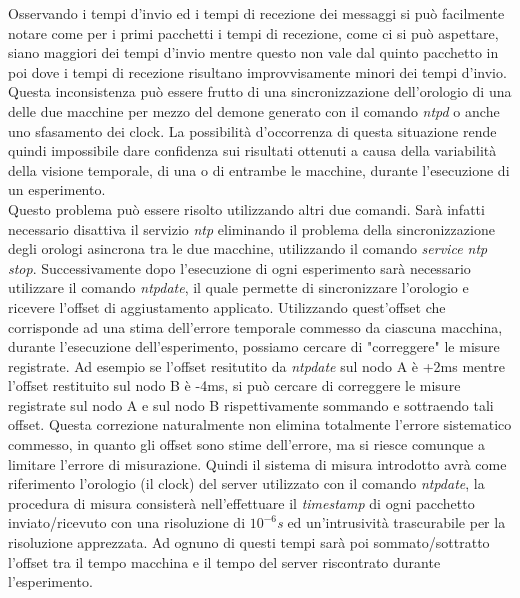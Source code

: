 Osservando i tempi d'invio ed i tempi di recezione dei messaggi si può facilmente notare come per i primi pacchetti i tempi di recezione, come ci si può aspettare, siano maggiori dei tempi d'invio mentre questo non vale dal quinto pacchetto in poi dove i tempi di recezione risultano improvvisamente minori dei tempi d'invio. Questa inconsistenza può essere frutto di una sincronizzazione dell'orologio di una delle due macchine per mezzo del demone generato con il comando \textit{ntpd} o anche uno sfasamento dei clock. La possibilità d'occorrenza di questa situazione rende quindi impossibile dare confidenza sui risultati ottenuti a causa della variabilità della visione temporale, di una o di entrambe le macchine, durante l'esecuzione di un esperimento.\\
Questo problema può essere risolto utilizzando altri due comandi. Sarà infatti necessario disattiva il servizio \textit{ntp} eliminando il problema della sincronizzazione degli orologi asincrona tra le due macchine, utilizzando il comando \textit{service ntp stop}. Successivamente dopo l'esecuzione di ogni esperimento sarà necessario utilizzare il comando \textit{ntpdate}, il quale permette di sincronizzare l'orologio e ricevere l'offset di aggiustamento applicato. Utilizzando quest'offset che corrisponde ad una stima dell'errore temporale commesso da ciascuna macchina, durante l'esecuzione dell'esperimento, possiamo cercare di "correggere" le misure registrate. Ad esempio se l'offset resitutito da \textit{ntpdate} sul nodo A è +2ms mentre l'offset restituito sul nodo B è -4ms, si può cercare di correggere le misure registrate sul nodo A e sul nodo B rispettivamente sommando e sottraendo tali offset.
Questa correzione naturalmente non elimina totalmente l'errore sistematico commesso, in quanto gli offset sono stime dell'errore, ma si riesce comunque a limitare l'errore di misurazione.
Quindi il sistema di misura introdotto avrà come riferimento l'orologio (il clock) del server utilizzato con il comando \textit{ntpdate}, la procedura di misura consisterà nell'effettuare il \textit{timestamp} di ogni pacchetto inviato/ricevuto con una risoluzione di \textit{$10^{-6}$s} ed un'intrusività trascurabile per la risoluzione apprezzata. Ad ognuno di questi tempi sarà poi sommato/sottratto l'offset tra il tempo macchina e il tempo del server riscontrato durante l'esperimento.


